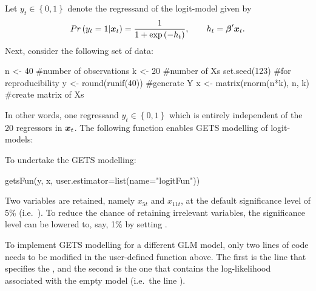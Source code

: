 Let $y_t \in \left\{0,1\right\}$ denote the regressand of the logit-model given by
%
\begin{equation}
	Pr\left(y_t=1|\boldsymbol{x}_t\right) = \frac{1}{1+\exp\left(-h_t\right)}, \qquad h_t = \boldsymbol{\beta}'\boldsymbol{x}_t.
\end{equation}
%
Next, consider the following set of data:
%
\begin{example}
  n <- 40 #number of observations
  k <- 20 #number of Xs
  set.seed(123) #for reproducibility
  y <- round(runif(40)) #generate Y
  x <- matrix(rnorm(n*k), n, k) #create matrix of Xs
\end{example}
%
In other words, one regressand $y_t \in \left\{0,1\right\}$ which is entirely independent of the 20 regressors in $\boldsymbol{x}_t$. The following function enables GETS modelling of logit-models:

%
To undertake the GETS modelling:
%
\begin{example}
  getsFun(y, x, user.estimator=list(name="logitFun"))
\end{example}
%
Two variables are retained, namely $x_{5t}$ and $x_{11t}$, at the default significance level of 5\% (i.e.\ ). To reduce the chance of retaining irrelevant variables, the significance level can be lowered to, say, 1\% by setting .

To implement GETS modelling for a different GLM model, only two lines of code needs to be modified in the user-defined function above. The first is the line that specifies the , and the second is the one that contains the log-likelihood associated with the empty model (i.e.\ the line ).

